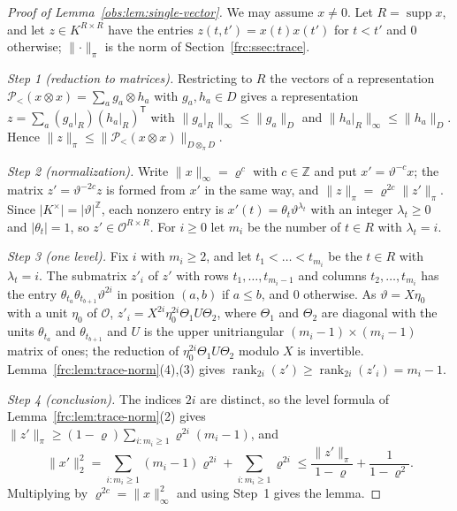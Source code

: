 \documentclass[11pt]{amsart}
\theoremstyle{definition}
\theoremstyle{remark}
\numberwithin{equation}{section}
\newcommand{\Z}{\mathbb Z}
\newcommand{\abs}[1]{\lvert #1\rvert}
\newcommand{\norm}[1]{\lVert #1\rVert}
\newcommand{\rank}{\operatorname{rank}}
\theoremstyle{plain}
\theoremstyle{definition}
\theoremstyle{plain}
\newcommand{\cP}{\mathcal P}
\begin{document}
\begin{proof}[Proof of Lemma~\ref{obs:lem:single-vector}]
We may assume $x\ne0$. Let $R=\operatorname{supp}x$, and let $z\in K^{R\times R}$ have the entries $z(t,t')=x(t)x(t')$
for $t<t'$ and $0$ otherwise; $\norm\cdot_\pi$ is the norm of Section~\ref{frc:ssec:trace}.

\emph{Step 1 (reduction to matrices).} Restricting to $R$ the vectors of a representation
$\cP_<(x\otimes x)=\sum_ag_a\otimes h_a$ with $g_a,h_a\in D$ gives a representation
$z=\sum_a(g_a|_R)(h_a|_R)^{\mathsf T}$ with $\norm{g_a|_R}_\infty\le\norm{g_a}_D$ and $\norm{h_a|_R}_\infty\le\norm{h_a}_D$.
Hence $\norm z_\pi\le\norm{\cP_<(x\otimes x)}_{D\otimes_\pi D}$.

\emph{Step 2 (normalization).} Write $\norm x_\infty=\varrho^c$ with $c\in\Z$ and put $x'=\vartheta^{-c}x$; the matrix
$z'=\vartheta^{-2c}z$ is formed from $x'$ in the same way, and $\norm z_\pi=\varrho^{2c}\norm{z'}_\pi$. Since
$\abs{K^\times}=\abs\vartheta^\Z$, each nonzero entry is $x'(t)=\theta_t\vartheta^{\lambda_t}$ with an integer $\lambda_t\ge0$
and $\abs{\theta_t}=1$, so
$z'\in\mathcal O^{R\times R}$. For $i\ge0$ let $m_i$ be the number of $t\in R$ with $\lambda_t=i$.

\emph{Step 3 (one level).} Fix $i$ with $m_i\ge2$, and let $t_1<\dots<t_{m_i}$ be the $t\in R$ with $\lambda_t=i$. The
submatrix $z'_i$ of $z'$ with rows $t_1,\dots,t_{m_i-1}$ and columns $t_2,\dots,t_{m_i}$ has the entry
$\theta_{t_a}\theta_{t_{b+1}}\vartheta^{2i}$ in position $(a,b)$ if $a\le b$, and $0$ otherwise. As $\vartheta=X\eta_0$
with a unit $\eta_0$ of $\mathcal O$, $z'_i=X^{2i}\eta_0^{2i}\Theta_1U\Theta_2$, where $\Theta_1$ and $\Theta_2$ are
diagonal with the units $\theta_{t_a}$ and $\theta_{t_{b+1}}$ and $U$ is the upper unitriangular
$(m_i-1)\times(m_i-1)$ matrix of ones; the reduction of $\eta_0^{2i}\Theta_1U\Theta_2$ modulo $X$ is invertible.
Lemma~\ref{frc:lem:trace-norm}(4),(3) gives $\rank_{2i}(z')\ge\rank_{2i}(z'_i)=m_i-1$.

\emph{Step 4 (conclusion).} The indices $2i$ are distinct, so the level formula of Lemma~\ref{frc:lem:trace-norm}(2) gives
$\norm{z'}_\pi\ge(1-\varrho)\sum_{i:m_i\ge1}\varrho^{2i}(m_i-1)$, and
\[
 \norm{x'}_2^2=\sum_{i:m_i\ge1}(m_i-1)\varrho^{2i}+\sum_{i:m_i\ge1}\varrho^{2i}
 \le\frac{\norm{z'}_\pi}{1-\varrho}+\frac1{1-\varrho^2}.
\]
Multiplying by $\varrho^{2c}=\norm x_\infty^2$ and using Step~1 gives the lemma.
\end{proof}
\end{document}
